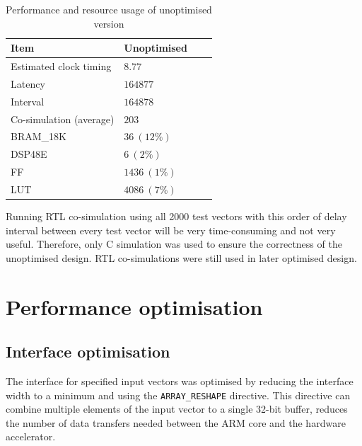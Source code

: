 \documentclass[journal]{IEEEtran}
\begin{document}
\begin{table}[ht]
	\renewcommand{\arraystretch}{1.3}
	\caption{Performance and resource usage of unoptimised version}
	\label{tbl:res_unopt}
	\centering
	\begin{tabular}{llll}
		\hline
		Item			& Unoptimised	\\
		\hline
		Estimated clock timing	& $8.77$	\\
		Latency			& $164877$	\\
		Interval		& $164878$	\\
		Co-simulation (average)	& $203$		\\
		\hline
		BRAM\_18K		& $36~(12\%)$	\\
		DSP48E			& $6~(2\%)$	\\
		FF			& $1436~(1\%)$	\\
		LUT			& $4086~(7\%)$	\\
		\hline
	\end{tabular}
\end{table}

Running RTL co-simulation using all 2000 test vectors with this order of delay interval between every test vector will be very time-consuming and not very useful. Therefore, only C simulation was used to ensure the correctness of the unoptimised design. RTL co-simulations were still used in later optimised design.

\section{Performance optimisation}

\subsection{Interface optimisation}

The interface for specified input vectors was optimised by reducing the interface width to a minimum and using the \texttt{ARRAY\_RESHAPE} directive. This directive can combine multiple elements of the input vector to a single 32-bit buffer, reduces the number of data transfers needed between the ARM core and the hardware accelerator.
\end{document}
